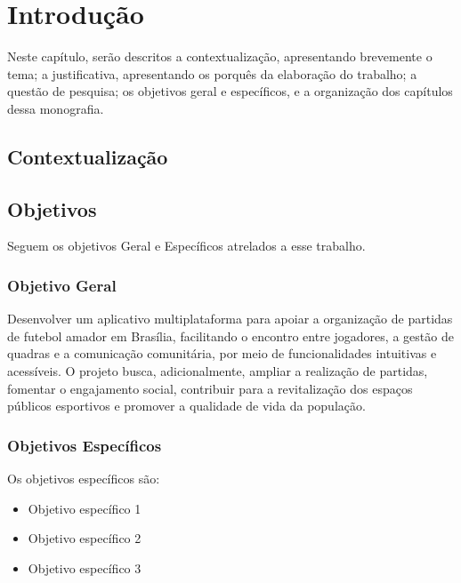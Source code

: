 \chapter[Introdução]{Introdução}

Neste capítulo, serão descritos a contextualização, apresentando brevemente o
tema; a justificativa, apresentando os porquês da elaboração do trabalho; a questão de
pesquisa; os objetivos geral e específicos, e a organização dos capítulos dessa monografia.

\section{Contextualização}

\section{Objetivos}

Seguem os objetivos Geral e Específicos atrelados a esse trabalho.

\subsection{Objetivo Geral}

Desenvolver um aplicativo multiplataforma para apoiar a organização de partidas de futebol amador em Brasília, facilitando o encontro entre jogadores, a gestão de quadras e a comunicação comunitária, por meio de funcionalidades intuitivas e acessíveis. O projeto busca, adicionalmente, ampliar a realização de partidas, fomentar o engajamento social, contribuir para a revitalização dos espaços públicos esportivos e promover a qualidade de vida da população.

\subsection{Objetivos Específicos}

Os objetivos específicos são:

\begin{itemize}
    \item Objetivo específico 1
    \item Objetivo específico 2
    \item Objetivo específico 3
\end{itemize}